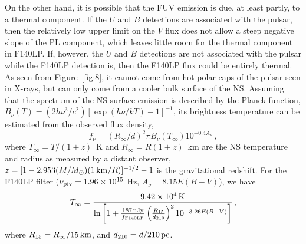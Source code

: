 \documentclass[pdftex,twocolumn]{aastex62}
\newcommand{\gp}[1]{{\color{blue} #1}}
\begin{document}
On the other hand, it is possible that the FUV emission is due, at least partly, to a thermal component. If the $U$ and $B$ detections 
are associated with the pulsar, 
then the relatively low upper limit on the $V$ flux does not allow a steep negative slope of the PL component, which leaves little room for the thermal component in F140LP.
If, however, the $U$ and $B$ detections are not associated with the pulsar
while the F140LP detection is,
then the F140LP flux  could be entirely thermal. 
As seen from Figure~\ref{fig:8}, it cannot come from  hot polar caps of the pulsar seen in X-rays, but can only come from a cooler bulk surface of the NS.
Assuming that the
spectrum of the NS surface emission 
is described by the Planck function,
$B_\nu(T) = (2h\nu^3/c^2)[\exp(h\nu/kT)-1]^{-1}$, 
its brightness temperature can be estimated 
from the observed flux density, %
\begin{equation}
f_\nu = (R_\infty/d)^2 \pi B_\nu(T_\infty) 10^{-0.4 A_\nu}\,,
\label{eq1}
\end{equation}
where 
$T_\infty=T/(1+z)$~K  and  $R_\infty=R(1+z)$~km  are the NS 
temperature and radius
as measured by a distant observer, $z=[1-2.953 %
(M/M_\odot)(1\,{\rm km}/R)]^{-1/2} - 1$
is the gravitational redshift.
For the F140LP filter ($\nu_{\rm piv} = 1.96\times 10^{15}$ Hz, $A_\nu = 8.15  E(B-V)$), 
we have
\begin{equation}
T_\infty = \frac{9.42\times 10^4\,{\rm K}}{\ln\left[1 + \frac{187\,{\rm nJy}}{f_{\rm F140LP}}\left(\frac{R_{15}}{d_{210}}\right)^2 10^{-3.26 E(B-V)}\right]}\,,
\end{equation}
where  
$R_{15}=R_\infty/15\,{\rm km}$, and $d_{210}= d/210\,{\rm pc}$.
\end{document}
